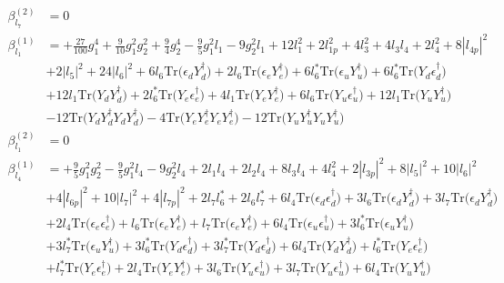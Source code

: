 {\begin{align}
\beta_{l_7}^{(2)} & =  
0\\ 
\beta_{l_1}^{(1)} & =  
+\frac{27}{100} g_{1}^{4} +\frac{9}{10} g_{1}^{2} g_{2}^{2} +\frac{9}{4} g_{2}^{4} -\frac{9}{5} g_{1}^{2} l_1 -9 g_{2}^{2} l_1 +12 l_{1}^{2} +2 l_{1p}^{2} +4 l_{3}^{2} +4 l_3 l_4 +2 l_{4}^{2} +8 |l_{4p}|^2 \nonumber \\ 
 &+2 |l_5|^2 +24 |l_6|^2 +6 l_6 \mbox{Tr}\Big({\epsilon_d  Y_{d}^{\dagger}}\Big) +2 l_6 \mbox{Tr}\Big({\epsilon_e  Y_{e}^{\dagger}}\Big) +6 l_6^* \mbox{Tr}\Big({\epsilon_u  Y_{u}^{\dagger}}\Big) +6 l_6^* \mbox{Tr}\Big({Y_d  \epsilon_{d}^{\dagger}}\Big) \nonumber \\ 
 &+12 l_1 \mbox{Tr}\Big({Y_d  Y_{d}^{\dagger}}\Big) +2 l_6^* \mbox{Tr}\Big({Y_e  \epsilon_{e}^{\dagger}}\Big) +4 l_1 \mbox{Tr}\Big({Y_e  Y_{e}^{\dagger}}\Big) +6 l_6 \mbox{Tr}\Big({Y_u  \epsilon_{u}^{\dagger}}\Big) +12 l_1 \mbox{Tr}\Big({Y_u  Y_{u}^{\dagger}}\Big) \nonumber \\ 
 &-12 \mbox{Tr}\Big({Y_d  Y_{d}^{\dagger}  Y_d  Y_{d}^{\dagger}}\Big) -4 \mbox{Tr}\Big({Y_e  Y_{e}^{\dagger}  Y_e  Y_{e}^{\dagger}}\Big) -12 \mbox{Tr}\Big({Y_u  Y_{u}^{\dagger}  Y_u  Y_{u}^{\dagger}}\Big) \\ 
\beta_{l_1}^{(2)} & =  
0\\ 
\beta_{l_4}^{(1)} & =  
+\frac{9}{5} g_{1}^{2} g_{2}^{2} -\frac{9}{5} g_{1}^{2} l_4 -9 g_{2}^{2} l_4 +2 l_1 l_4 +2 l_2 l_4 +8 l_3 l_4 +4 l_{4}^{2} +2 |l_{3p}|^2 +8 |l_5|^2 +10 |l_6|^2 \nonumber \\ 
 &+4 |l_{6p}|^2 +10 |l_7|^2 +4 |l_{7p}|^2 +2 l_7 l_6^* +2 l_6 l_7^* +6 l_4 \mbox{Tr}\Big({\epsilon_d  \epsilon_{d}^{\dagger}}\Big) +3 l_6 \mbox{Tr}\Big({\epsilon_d  Y_{d}^{\dagger}}\Big) +3 l_7 \mbox{Tr}\Big({\epsilon_d  Y_{d}^{\dagger}}\Big) \nonumber \\ 
 &+2 l_4 \mbox{Tr}\Big({\epsilon_e  \epsilon_{e}^{\dagger}}\Big) +l_6 \mbox{Tr}\Big({\epsilon_e  Y_{e}^{\dagger}}\Big) +l_7 \mbox{Tr}\Big({\epsilon_e  Y_{e}^{\dagger}}\Big) +6 l_4 \mbox{Tr}\Big({\epsilon_u  \epsilon_{u}^{\dagger}}\Big) +3 l_6^* \mbox{Tr}\Big({\epsilon_u  Y_{u}^{\dagger}}\Big) \nonumber \\ 
 &+3 l_7^* \mbox{Tr}\Big({\epsilon_u  Y_{u}^{\dagger}}\Big) +3 l_6^* \mbox{Tr}\Big({Y_d  \epsilon_{d}^{\dagger}}\Big) +3 l_7^* \mbox{Tr}\Big({Y_d  \epsilon_{d}^{\dagger}}\Big) +6 l_4 \mbox{Tr}\Big({Y_d  Y_{d}^{\dagger}}\Big) +l_6^* \mbox{Tr}\Big({Y_e  \epsilon_{e}^{\dagger}}\Big) \nonumber \\ 
 &+l_7^* \mbox{Tr}\Big({Y_e  \epsilon_{e}^{\dagger}}\Big) +2 l_4 \mbox{Tr}\Big({Y_e  Y_{e}^{\dagger}}\Big) +3 l_6 \mbox{Tr}\Big({Y_u  \epsilon_{u}^{\dagger}}\Big) +3 l_7 \mbox{Tr}\Big({Y_u  \epsilon_{u}^{\dagger}}\Big) +6 l_4 \mbox{Tr}\Big({Y_u  Y_{u}^{\dagger}}\Big) \nonumber \\ 

\end{align}}
